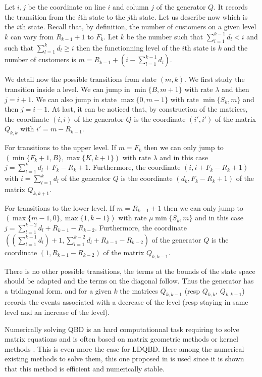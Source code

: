 \documentclass[conference]{IEEEtran}
\begin{document}
\begin{IEEEproof}
Let $i,j$ be the coordinate on line $i$ and column $j$ of the generator $Q$. It records the transition
from the $i$th state to the $j$th state.
Let us describe now which is the $i$th state. Recall that, by definition, the number of customers on a given level
$k$ can vary from $R_{k-1}+1$ to $F_k$. Let $k$ be the number such that
$\sum_{l=1}^{k-1} d_l <i$ and such that $\sum_{l=1}^{k} d_l  \geq i$ then the functionning level of the $i$th state is
$k$ and the number of customers is $m=R_{k-1}+\left(i-\sum_{l=1}^{k-1} d_l\right)$.

We detail now the possible transitions from state $(m,k)$.
We first study the transition inside a level. We can jump in $\min\{B,m+1\}$ with rate $\lambda$ and then $j=i+1$.
We can also jump in state $\max\{0,m-1\}$ with rate $\min\{S_k,m\}$ and then $j=i-1$.
At last, it can be noticed that, by construction of the matrices, the coordinate $(i,i)$ of the generator $Q$
is the coordinate $(i',i')$ of the matrix $Q_{k,k}$ with $i'=m-R_{k-1}$.

For transitions to the upper level. If $m=F_k$ then
we can only jump to $(\min\{F_k+1,B\},\max\{K,k+1\})$ with rate $\lambda$ and
in this case $j=\sum_{l=1}^{k} d_l + F_k-R_{k}+1$.
Furthermore, the coordinate $(i,i+F_k-R_{k}+1)$ with $i=\sum_{l=1}^{k} d_l$ of the generator $Q$
is the coordinate $(d_k,F_k-R_{k}+1)$ of the matrix $Q_{k,k+1}$.

For transitions to the lower level. If $m=R_{k-1}+1$ then
we can only jump to $(\max\{m-1,0\},\max\{1,k-1\})$ with rate $\mu \min\{S_k,m\}$
and in this case $j=\sum_{l=1}^{k-2} d_l + R_{k-1} - R_{k-2}$.
Furthermore, the coordinate $((\sum_{l=1}^{k-1} d_l)+1,\sum_{l=1}^{k-2} d_l + R_{k-1} - R_{k-2})$
of the generator $Q$ is the coordinate $(1,R_{k-1} - R_{k-2})$ of the matrix $Q_{k,k-1}$.

There is no other possible transitions, the terms at the bounds of the state space should be adapted and
the terms on the diagonal follow. Thus the generator has a tridiagonal form.
and for a given $k$ the matrices $Q_{k,k-1}$ (resp $Q_{k,k}$, $Q_{k,k+1}$)
records the events associated with a decrease of the level (resp staying in same level and an increase of the level).
\end{IEEEproof}

Numerically solving QBD is an hard computationnal task requiring to solve
matrix equations and is often based on matrix geometric methods
\cite{Neuts1981,art:latoucherama} or kernel methods \cite{gaujal2006optimal}. 
This is even more the case for LDQBD.  
Here among the numerical existing methods to solve them, this one proposed in  \cite{baumann2010numerical}
is used since it is shown that this method is efficient and numerically stable.
\end{document}
